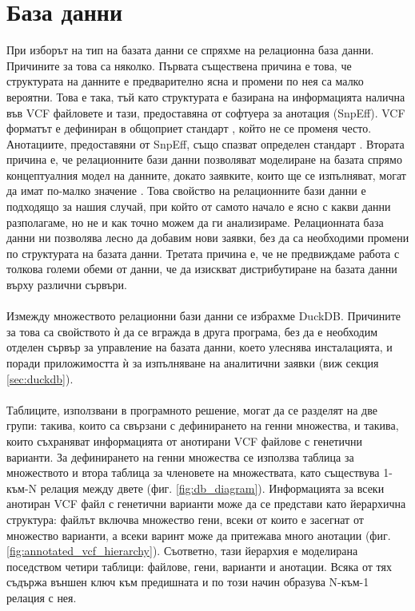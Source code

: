 \documentclass[pdftex,cyrillic,14pt,a4page,twoside,openright]{extreport}
\begin{document}
\section{База данни}
При изборът на тип на базата данни се спряхме на релационна база данни. Причините за това са няколко. Първата съществена причина е това, че структурата на данните е предварително ясна и промени по нея са малко вероятни. Това е така, тъй като структурата е базирана на информацията налична във VCF файловете и тази, предоставяна от софтуера за анотация (SnpEff). VCF форматът е дефиниран в общоприет стандарт \cite{danecek2011variant}, който не се променя често. Анотациите, предоставяни от SnpEff, също спазват определен стандарт \cite{cingolani2018variant}. Втората причина е, че релационните бази данни позволяват моделиране на базата спрямо концептуалния модел на данните, докато заявките, които ще се изпълняват, могат да имат по-малко значение \cite{chebotko2015}. Това свойство на релационните бази данни е подходящо за нашия случай, при който от самото начало е ясно с какви данни разполагаме, но не и как точно можем да ги анализираме. Релационната база данни ни позволява лесно да добавим нови заявки, без да са необходими промени по структурата на базата данни. Третата причина е, че не предвиждаме работа с толкова големи обеми от данни, че да изискват дистрибутиране на базата данни върху различни сървъри.

\paragraph{}
Измежду множеството релационни бази данни се избрахме DuckDB. Причините за това са свойството ѝ да се вгражда в друга програма, без да е необходим отделен сървър за управление на базата данни, което улеснява инсталацията, и поради приложимостта ѝ за изпълняване на аналитични заявки (виж секция \ref{sec:duckdb}).

\paragraph{}
Таблиците, използвани в програмното решение, могат да се разделят на две групи: такива, които са свързани с дефинирането на генни множества, и такива, които съхраняват информацията от анотирани VCF файлове с генетични варианти. За дефинирането на генни множества се използва таблица за множеството и втора таблица за членовете на множествата, като съществува 1-към-N релация между двете (фиг. \ref{fig:db_diagram}). Информацията за всеки анотиран VCF файл с генетични варианти може да се представи като йерархична структура: файлът включва множество гени, всеки от които е засегнат от множество варианти, а всеки варинт може да притежава много анотации (фиг. \ref{fig:annotated_vcf_hierarchy}). Съответно, тази йерархия е моделирана поседством четири таблици: файлове, гени, варианти и анотации. Всяка от тях съдържа външен ключ към предишната и по този начин образува N-към-1 релация с нея.
\end{document}
